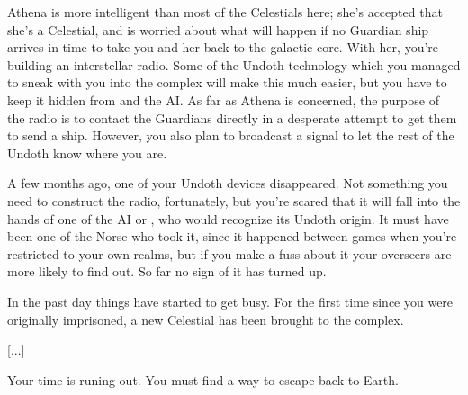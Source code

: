 \documentclass[char]{guardians}
\begin{document}
Athena is more intelligent than most of the Celestials here; she's accepted that she's a Celestial, and is worried about what will happen if no Guardian ship arrives in time to take you and her back to the galactic core. With her, you're building an interstellar radio. Some of the Undoth technology which you managed to sneak with you into the complex will make this much easier, but you have to keep it hidden from \cJascha{} and the AI. As far as Athena is concerned, the purpose of the radio is to contact the Guardians directly in a desperate attempt to get them to send a ship. However, you also plan to broadcast a signal to let the rest of the Undoth know where you are.

A few months ago, one of your Undoth devices disappeared. Not something you need to construct the radio, fortunately, but you're scared that it will fall into the hands of one of the AI or \cJascha{}, who would recognize its Undoth origin. It must have been one of the Norse who took it, since it happened between games when you're restricted to your own realms, but if you make a fuss about it your overseers are more likely to find out. So far no sign of it has turned up.

In the past day things have started to get busy. For the first time since you were originally imprisoned, a new Celestial has been brought to the complex.

[...]



Your time is runing out. You must find a way to escape back to Earth.




\end{document}
